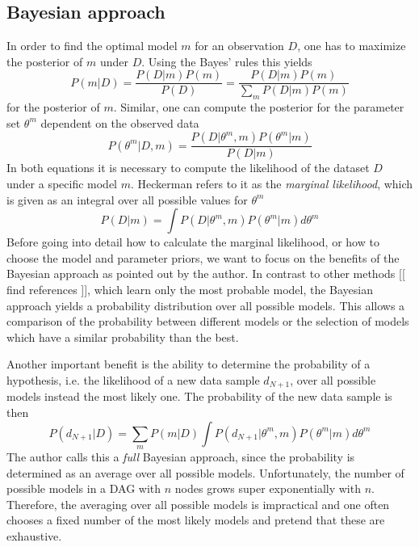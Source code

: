 \documentclass{article}
\begin{document}
	\subsection{Bayesian approach}
	In order to find the optimal model $m$ for an observation $D$, one has to maximize the posterior of $m$
	under $D$. Using the Bayes' rules this yields 
	\begin{equation}
		P(m|D) = \frac{P(D|m)P(m)}{P(D)}=\frac{P(D|m)P(m)}{\sum_m P(D|m)P(m)}
	\end{equation}
	for the posterior of $m$. Similar, one can compute the posterior for the parameter set $\theta^m$ dependent
	on the observed data
	\begin{equation}
		P(\theta^m|D,m)= \frac{P(D|\theta^m,m)P(\theta^m|m)}{P(D|m)}
	\end{equation}
	In both equations it is necessary to compute the likelihood of the dataset $D$ under a specific model $m$.
	Heckerman refers to it as the \textit{marginal likelihood}, which is given as an integral over all
	possible values for $\theta^m$
	\begin{equation}
		P(D|m) = \int P(D|\theta^m,m)P(\theta^m|m) d\theta^m
		\label{eqn:marginal}
	\end{equation}
	Before going into detail how to calculate the marginal likelihood, or how to choose the model and parameter
	priors, we want to focus on the benefits of the Bayesian approach as pointed out by the author. In
	contrast to other methods [[ find references ]], which learn only the most probable model, the
	Bayesian approach yields a probability distribution over all possible models. This allows a 
	comparison of the probability between different models or the selection of models which have a similar
	probability than the best.
	
	Another important benefit is the ability to determine the probability of a hypothesis,
	i.e. the likelihood of a	new data sample $d_{N+1}$, over all possible models
	instead the most likely one. The probability of the new data sample is then
	\[
		P(d_{N+1}|D)=\sum_m P(m|D)\int P(d_{N+1}|\theta^m,m)P(\theta^m|m)d\theta^m
	\]
	The author calls this a \textit{full} Bayesian approach, since the probability is determined as an average
	over all possible models. Unfortunately, the number of possible models in a DAG with $n$ nodes grows
	super exponentially with $n$. Therefore, the averaging over all possible models is impractical and
	one often chooses a fixed number of the most likely models and pretend that these are exhaustive.
	
\end{document}
